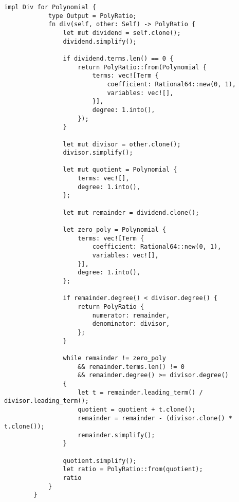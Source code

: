     \begin{lstlisting}[caption={The implementation of the division operation for the \texttt{Polynomial} struct}, label={lst:polynomial-div}]
        impl Div for Polynomial {
            type Output = PolyRatio;
            fn div(self, other: Self) -> PolyRatio {
                let mut dividend = self.clone();
                dividend.simplify();
        
                if dividend.terms.len() == 0 {
                    return PolyRatio::from(Polynomial {
                        terms: vec![Term {
                            coefficient: Rational64::new(0, 1),
                            variables: vec![],
                        }],
                        degree: 1.into(),
                    });
                }
        
                let mut divisor = other.clone();
                divisor.simplify();
        
                let mut quotient = Polynomial {
                    terms: vec![],
                    degree: 1.into(),
                };
        
                let mut remainder = dividend.clone();
        
                let zero_poly = Polynomial {
                    terms: vec![Term {
                        coefficient: Rational64::new(0, 1),
                        variables: vec![],
                    }],
                    degree: 1.into(),
                };
        
                if remainder.degree() < divisor.degree() {
                    return PolyRatio {
                        numerator: remainder,
                        denominator: divisor,
                    };
                }
        
                while remainder != zero_poly
                    && remainder.terms.len() != 0
                    && remainder.degree() >= divisor.degree()
                {
                    let t = remainder.leading_term() / divisor.leading_term();
                    quotient = quotient + t.clone();
                    remainder = remainder - (divisor.clone() * t.clone());
                    remainder.simplify();
                }
        
                quotient.simplify();
                let ratio = PolyRatio::from(quotient);
                ratio
            }
        }
    \end{lstlisting}        

